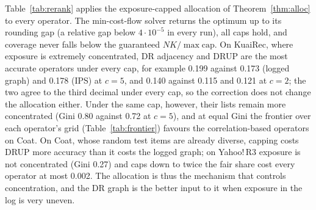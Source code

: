 Table~\ref{tab:rerank} applies the exposure-capped allocation of
Theorem~\ref{thm:alloc} to every operator. The min-cost-flow solver returns the
optimum up to its rounding gap (a relative gap below $4\cdot10^{-5}$ in every run), all
caps hold, and coverage never falls below the guaranteed $NK/\max\mathrm{cap}$. On KuaiRec, where exposure is extremely concentrated,
DR adjacency and DRUP are the most accurate operators under every cap, for
example 0.199 against 0.173 (logged graph) and 0.178 (IPS) at $c=5$, and 0.140
against 0.115 and 0.121 at $c=2$; the two agree to the third decimal under
every cap, so the correction does not change the allocation either. Under the same cap, however, their lists
remain more concentrated (Gini 0.80 against 0.72 at $c=5$), and at equal Gini
the frontier over each operator's grid (Table~\ref{tab:frontier}) favours the
correlation-based operators on Coat. On Coat, whose random test items are already
diverse, capping costs DRUP more accuracy than it costs the logged graph; on
Yahoo!\,R3 exposure is not concentrated (Gini 0.27) and caps down to twice the
fair share cost every operator at most 0.002. The allocation is thus the
mechanism that controls concentration, and the DR graph is the better input to
it when exposure in the log is very uneven.
